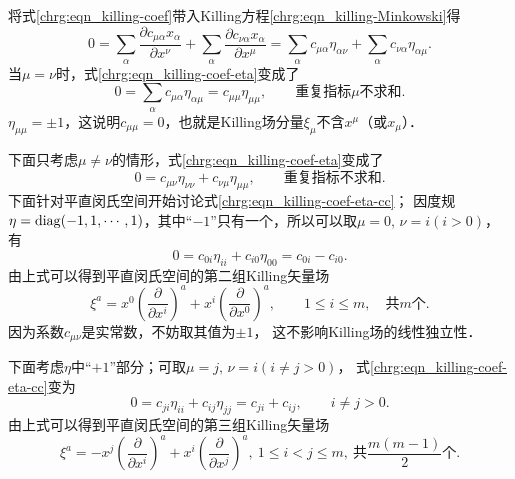 将式\eqref{chrg:eqn_killing-coef}带入Killing方程\eqref{chrg:eqn_killing-Minkowski}得
\begin{equation}\label{chrg:eqn_killing-coef-eta}
    0=\sum_{\alpha}\frac{\partial c_{\mu \alpha}x_\alpha}{\partial x^\nu}
    +\sum_{\alpha} \frac{\partial c_{\nu \alpha}x_\alpha}{\partial x^\mu}
    =\sum_{\alpha} c_{\mu \alpha} \eta_{\alpha \nu}+\sum_{\alpha} c_{\nu \alpha} \eta_{\alpha \mu} .
\end{equation}
当$\mu=\nu$时，式\eqref{chrg:eqn_killing-coef-eta}变成了
\begin{equation}
    0=\sum_{\alpha} c_{\mu \alpha} \eta_{\alpha \mu} =c_{\mu \mu} \eta_{\mu \mu} ,
    \qquad \text{重复指标}\mu\text{不求和}.
\end{equation}
$\eta_{\mu \mu}=\pm 1$，这说明$c_{\mu \mu}=0$，也就是Killing场分量$\xi_\mu$不含$x^\mu$（或$x_\mu$）．

下面只考虑$\mu\neq\nu$的情形，式\eqref{chrg:eqn_killing-coef-eta}变成了
\begin{equation}\label{chrg:eqn_killing-coef-eta-cc}
    0=c_{\mu \nu} \eta_{\nu \nu}+c_{\nu \mu} \eta_{\mu \mu} , \qquad \text{重复指标不求和}.
\end{equation}
下面针对平直闵氏空间开始讨论式\eqref{chrg:eqn_killing-coef-eta-cc}；
因度规$\eta={\rm diag}(-1,1,\cdots,1)$，其中“$-1$”只有一个，所以可以取$\mu=0,\,\nu=i(i>0)$，有
\begin{equation}
    0=c_{0i} \eta_{ii}+c_{i 0} \eta_{00} =c_{0i} -c_{i 0} .
\end{equation}
由上式可以得到平直闵氏空间的第二组Killing矢量场
\begin{equation}\label{chrg:eqn_Killing-Minkowski-2}
    \xi^a=x^0 \left(\frac{\partial}{\partial x^i}\right)^a
    +x^i \left(\frac{\partial}{\partial x^0}\right)^a, \qquad
    1\leqslant i \leqslant m,\quad \text{共$m$个}.
\end{equation}
因为系数$c_{\mu\nu}$是实常数，不妨取其值为$\pm 1$，
这不影响Killing场的线性独立性．

下面考虑$\eta$中“$+1$”部分；可取$\mu=j,\,\nu=i(i\neq j>0)$，
式\eqref{chrg:eqn_killing-coef-eta-cc}变为
\begin{equation}
    0=c_{ji} \eta_{ii}+c_{ij} \eta_{jj} =c_{ji} + c_{ij},  \qquad i\neq j>0 .
\end{equation}
由上式可以得到平直闵氏空间的第三组Killing矢量场
\begin{equation}\label{chrg:eqn_Killing-Minkowski-3}
    \xi^a= -x^j \left(\frac{\partial}{\partial x^i}\right)^a
    +x^i \left(\frac{\partial}{\partial x^j}\right)^a, \
    1\leqslant i < j \leqslant m,\ \text{共$\frac{m(m-1)}{2}$个}.
\end{equation}

